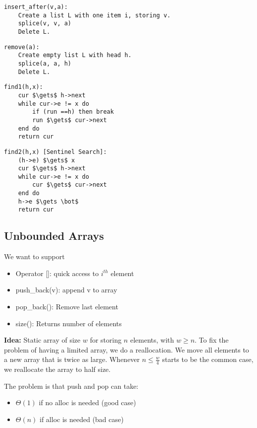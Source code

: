 \begin{algorithm}
\begin{lstlisting}
insert_after(v,a):
    Create a list L with one item i, storing v.
    splice(v, v, a)
    Delete L.
\end{lstlisting}
\begin{lstlisting}
remove(a):
    Create empty list L with head h.
    splice(a, a, h)
    Delete L.
\end{lstlisting}
\begin{lstlisting}[mathescape]
find1(h,x):
    cur $\gets$ h->next
    while cur->e != x do
        if (run ==h) then break
        run $\gets$ cur->next
    end do
    return cur
\end{lstlisting}
\begin{lstlisting}[mathescape]
find2(h,x) [Sentinel Search]:
    (h->e) $\gets$ x
    cur $\gets$ h->next
    while cur->e != x do
        cur $\gets$ cur->next
    end do
    h->e $\gets \bot$
    return cur
\end{lstlisting}
\end{algorithm}

\newpage

\subsection{Unbounded Arrays}

We want to support
\begin{itemize}
\item Operator []: quick access to $i^{th}$ element
\item push\_back(v): append v to array
\item pop\_back(): Remove last element
\item size(): Returns number of elements
\end{itemize}

\noindent \textbf{Idea:} Static array of size $w$ for storing $n$ elements, with $w \ge n$. To fix the problem of having a limited array, we do a reallocation. We move all elements to a new array that is twice as large. Whenever $n \le \frac{w}{4}$ starts to be the common case, we reallocate the array to half size.

The problem is that push and pop can take:
\begin{itemize}
\item $\Theta(1)$ if no alloc is needed (good case)
\item $\Theta(n)$ if alloc is needed (bad case)
\end{itemize}

